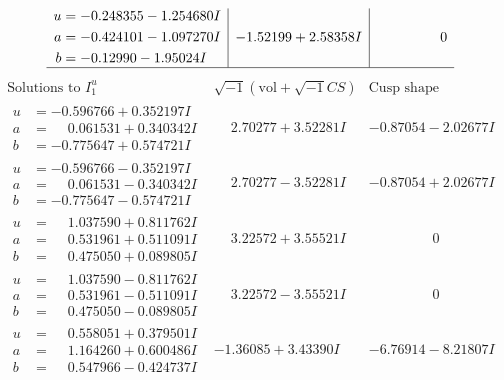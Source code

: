\documentclass[1p]{elsarticle_modified}
\theoremstyle{definition}
\newcommand{\I}{\sqrt{-1}}
\begin{document}
$$\begin{array}{c|c|c}
\begin{aligned}
u &= -0.248355 - 1.254680 I \\
a &= -0.424101 - 1.097270 I \\
b &= -0.12990 - 1.95024 I\end{aligned}
 & -1.52199 + 2.58358 I & \phantom{-0.000000 } 0\\
 \hline 
 \end{array}$$\newpage$$\begin{array}{c|c|c}  
\text{Solutions to }I^u_{1}& \I (\text{vol} + \sqrt{-1}CS) & \text{Cusp shape}\\
 \hline 
\begin{aligned}
u &= -0.596766 + 0.352197 I \\
a &= \phantom{-}0.061531 + 0.340342 I \\
b &= -0.775647 + 0.574721 I\end{aligned}
 & \phantom{-}2.70277 + 3.52281 I & -0.87054 - 2.02677 I \\ \hline\begin{aligned}
u &= -0.596766 - 0.352197 I \\
a &= \phantom{-}0.061531 - 0.340342 I \\
b &= -0.775647 - 0.574721 I\end{aligned}
 & \phantom{-}2.70277 - 3.52281 I & -0.87054 + 2.02677 I \\ \hline\begin{aligned}
u &= \phantom{-}1.037590 + 0.811762 I \\
a &= \phantom{-}0.531961 + 0.511091 I \\
b &= \phantom{-}0.475050 + 0.089805 I\end{aligned}
 & \phantom{-}3.22572 + 3.55521 I & \phantom{-0.000000 } 0 \\ \hline\begin{aligned}
u &= \phantom{-}1.037590 - 0.811762 I \\
a &= \phantom{-}0.531961 - 0.511091 I \\
b &= \phantom{-}0.475050 - 0.089805 I\end{aligned}
 & \phantom{-}3.22572 - 3.55521 I & \phantom{-0.000000 } 0 \\ \hline\begin{aligned}
u &= \phantom{-}0.558051 + 0.379501 I \\
a &= \phantom{-}1.164260 + 0.600486 I \\
b &= \phantom{-}0.547966 - 0.424737 I\end{aligned}
 & -1.36085 + 3.43390 I & -6.76914 - 8.21807 I \\ \hline\begin{aligned}

\end{aligned}
\end{array}$$
\end{document}

